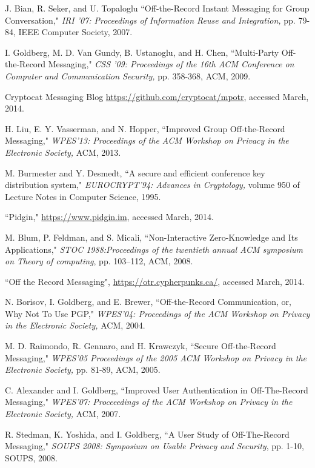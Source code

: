 \documentclass[%
preprint,
amsmath,amssymb,
aps,
prb,
floatfix,
]{revtex4-1}
\begin{document}
\begin{thebibliography}{99}
 J. Bian, R. Seker, and U. Topaloglu ``Off-the-Record Instant
Messaging for Group Conversation," \textit{IRI '07: Proceedings of Information
Reuse and Integration,} pp. 79-84, IEEE Computer Society, 2007.

 I. Goldberg, M. D. Van Gundy, B. Ustanoglu, and H. Chen,
``Multi-Party Off-the-Record Messaging," \textit{CSS '09: Proceedings of the
16th ACM Conference on Computer and Communication Security,} pp. 358-368, ACM,
2009.

 Cryptocat Messaging Blog
\url{https://github.com/cryptocat/mpotr}, accessed March, 2014.

 H. Liu, E. Y. Vasserman, and N. Hopper, ``Improved Group
Off-the-Record Messaging," \textit{WPES'13: Proceedings of the ACM Workshop on
Privacy in the Electronic Society,} ACM, 2013.

 M. Burmester and Y. Desmedt, ``A secure and efficient
conference key distribution system," \textit{EUROCRYPT'94: Advances in
Cryptology,} volume 950 of Lecture Notes in Computer Science, 1995.

 ``Pidgin," \url{https://www.pidgin.im}, accessed March,
2014.

 M. Blum, P. Feldman, and S. Micali, ``Non-Interactive
Zero-Knowledge and Its Applications," \textit{ STOC 1988:Proceedings of the
twentieth annual ACM symposium on Theory of computing}, pp. 103–112, ACM, 2008.

 ``Off the Record Messaging",
\url{https://otr.cypherpunks.ca/}, accessed March, 2014.

 N. Borisov, I. Goldberg, and E. Brewer, ``Off-the-Record
Communication, or, Why Not To Use PGP," \textit{WPES'04: Proceedings of the
ACM Workshop on Privacy in the Electronic Society,} ACM, 2004.

 M. D. Raimondo, R. Gennaro, and H. Krawczyk, ``Secure
Off-the-Record Messaging," \textit{WPES'05 Proceedings of the 2005 ACM Workshop
on Privacy in the Electronic Society,} pp. 81-89, ACM, 2005.

 C. Alexander and I. Goldberg, ``Improved User Authentication
in Off-The-Record Messaging," \textit{WPES'07: Proceeedings of the ACM Workshop
on Privacy in the Electronic Society,} ACM, 2007.

 R. Stedman, K. Yoshida, and I. Goldberg, ``A User Study of
Off-The-Record Messaging," \textit{SOUPS 2008: Symposium on Usable Privacy and
Security}, pp. 1-10, SOUPS, 2008.


\end{thebibliography}
\end{document}
